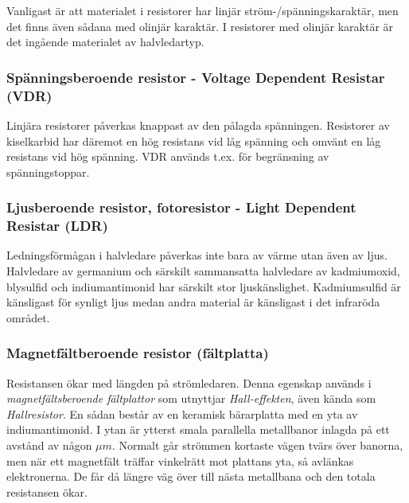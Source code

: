 Vanligast är att materialet i resistorer har linjär ström-/spänningskaraktär,
men det finns även sådana med olinjär karaktär. I resistorer med olinjär
karaktär är det ingående materialet av halvledartyp.

\subsubsection{Spänningsberoende resistor - Voltage Dependent Resistar (VDR)}

Linjära resistorer påverkas knappast av den pålagda spänningen. Resistorer av
kiselkarbid har däremot en hög resistans vid låg spänning och omvänt en låg
resistans vid hög spänning. VDR används t.ex. för begränsning av
spänningstoppar.

\subsubsection{Ljusberoende resistor, fotoresistor - Light Dependent Resistar (LDR)}

Ledningsförmågan i halvledare påverkas inte bara av värme utan även av ljus.
Halvledare av germanium och särskilt sammansatta halvledare av kadmiumoxid,
blysulfid och indiumantimonid har särskilt stor ljuskänslighet. Kadmiumsulfid
är känsligast för synligt ljus medan andra material är känsligast i det
infraröda området.

\subsubsection{Magnetfältberoende resistor (fältplatta)}

Resistansen ökar med längden på strömledaren. Denna egenskap används i
\emph{magnetfältsberoende fältplattor} som utnyttjar \emph{Hall-effekten}, även
kända som \emph{Hallresistor}. En sådan består av en keramisk bärarplatta med
en yta av indiumantimonid. I ytan är ytterst smala parallella metallbanor
inlagda på ett avstånd av någon \(\mu m\). Normalt går strömmen kortaste vägen
tvärs över banorna, men när ett magnetfält träffar vinkelrätt mot plattans yta,
så avlänkas elektronerna. De får då längre väg över till nästa metallbana och
den totala resistansen ökar.

